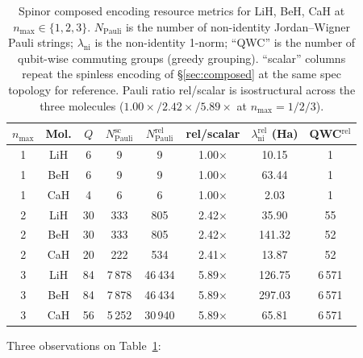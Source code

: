 \begin{table}[h]
\caption{Spinor composed encoding resource metrics for LiH, BeH,
CaH at $n_{\max} \in \{1, 2, 3\}$. $N_{\mathrm{Pauli}}$ is the
number of non-identity Jordan--Wigner Pauli strings;
$\lambda_{\mathrm{ni}}$ is the non-identity 1-norm;
``QWC'' is the number of qubit-wise commuting groups (greedy
grouping). ``scalar'' columns repeat the spinless encoding of
\S\ref{sec:composed} at the same spec topology for reference.
Pauli ratio rel/scalar is isostructural across the three molecules
($1.00\times / 2.42\times / 5.89\times$ at $n_{\max}=1/2/3$).}
\label{tab:spinor_resource}
\begin{ruledtabular}
\begin{tabular}{cccccccc}
$n_{\max}$ & Mol. & $Q$ & $N_{\mathrm{Pauli}}^{\mathrm{sc}}$ & $N_{\mathrm{Pauli}}^{\mathrm{rel}}$ & rel/scalar & $\lambda_{\mathrm{ni}}^{\mathrm{rel}}$ (Ha) & QWC$^{\mathrm{rel}}$ \\
\hline
1 & LiH & 6   & 9        & 9      & 1.00$\times$ & 10.15  & 1 \\
1 & BeH & 6   & 9        & 9      & 1.00$\times$ & 63.44  & 1 \\
1 & CaH & 4   & 6        & 6      & 1.00$\times$ & 2.03   & 1 \\
2 & LiH & 30  & 333      & 805    & 2.42$\times$ & 35.90  & 55 \\
2 & BeH & 30  & 333      & 805    & 2.42$\times$ & 141.32 & 52 \\
2 & CaH & 20  & 222      & 534    & 2.41$\times$ & 13.87  & 52 \\
3 & LiH & 84  & 7\,878   & 46\,434 & 5.89$\times$ & 126.75 & 6\,571 \\
3 & BeH & 84  & 7\,878   & 46\,434 & 5.89$\times$ & 297.03 & 6\,571 \\
3 & CaH & 56  & 5\,252   & 30\,940 & 5.89$\times$ & 65.81  & 6\,571 \\
\end{tabular}
\end{ruledtabular}
\end{table}

Three observations on Table~\ref{tab:spinor_resource}:

